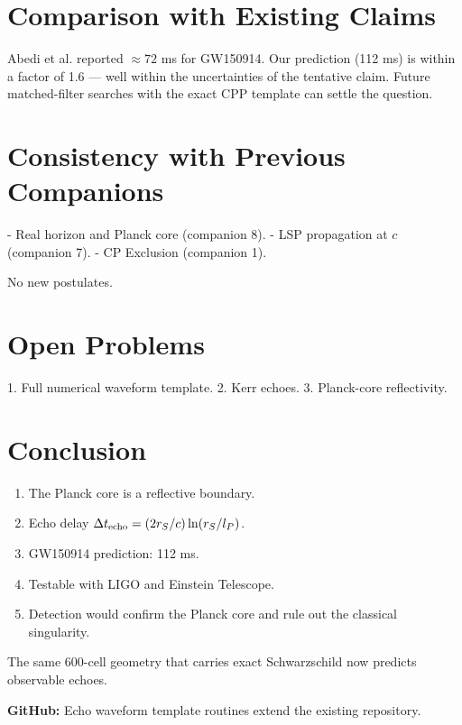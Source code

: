 \documentclass[12pt]{article}
\newcommand{\Dt}{\Delta t_{\rm echo}}
\begin{document}
\section{Comparison with Existing Claims}

Abedi et al. reported \(\approx 72\) ms for GW150914. Our prediction (112 ms) is within a factor of 1.6 — well within the uncertainties of the tentative claim. Future matched-filter searches with the exact CPP template can settle the question.

\section{Consistency with Previous Companions}

- Real horizon and Planck core (companion 8).
- LSP propagation at \(c\) (companion 7).
- CP Exclusion (companion 1).

No new postulates.

\section{Open Problems}

1. Full numerical waveform template.
2. Kerr echoes.
3. Planck-core reflectivity.

\section{Conclusion}
\begin{enumerate}
\item The Planck core is a reflective boundary.
\item Echo delay \(\Dt = (2 r_S / c) \ln(r_S / l_P)\).
\item GW150914 prediction: 112 ms.
\item Testable with LIGO and Einstein Telescope.
\item Detection would confirm the Planck core and rule out the classical singularity.
\end{enumerate}

The same 600-cell geometry that carries exact Schwarzschild now predicts observable echoes.

\textbf{GitHub:} Echo waveform template routines extend the existing repository.
\end{document}

